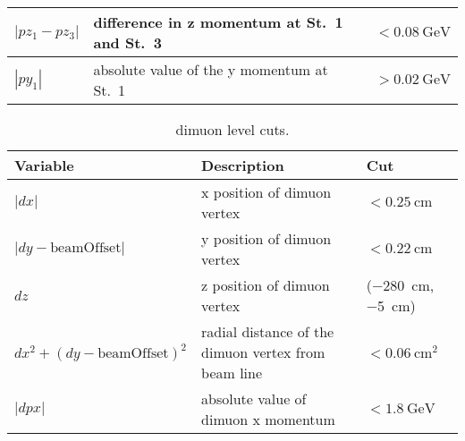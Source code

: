 \documentclass[../main.tex]{subfiles}
\begin{document}
\begin{table}[ht!]
\begin{tabular}{|m{4.5cm}|m{7cm}|m{3cm}|}
		$|pz_1 - pz_3|$                                                                                                                                                                          & difference in z momentum at St.~1 and St.~3                                          & $<\SI{0.08}{\GeV}$           \\ \hline
		$|py_1 |$                                                                                                                                                                                & absolute value of the y momentum   at St.~1                                          & $>\SI{0.02}{\GeV}$           \\ \hline
	\end{tabular}
\end{table}
\begin{table}[ht!]
	\centering
	\caption{dimuon level cuts.}
	\label{table:dimuonCut}
	\begin{tabular}{|m{4.5cm}|m{7cm}|m{3cm}|}
		\hline
		Variable                                                                                                                          & Description                                                                              & Cut                            \\ \hline
		$|dx|$                                                                                                                            & x position of dimuon vertex                                                              & $<\SI{0.25}{\cm}$              \\ \hline
		$|dy-\mathrm{beamOffset}|$                                                                                                        & y position of dimuon vertex                                                              & $<\SI{0.22}{\cm}$              \\ \hline
		$dz$                                                                                                                              & z position of dimuon vertex                                                              & (\SI{-280}{\cm},\SI{-5}{\cm})  \\ \hline
		$dx^2+(dy-\mathrm{beamOffset})^2$                                                                                                 & radial distance of the dimuon vertex from beam line                                      & $<\SI{0.06}{\cm\squared}$      \\ \hline
		$|dpx|$                                                                                                                           & absolute value of dimuon x   momentum                                                    & $<\SI{1.8}{\GeV}$              \\ \hline

\end{tabular}
\end{table}
\end{document}

